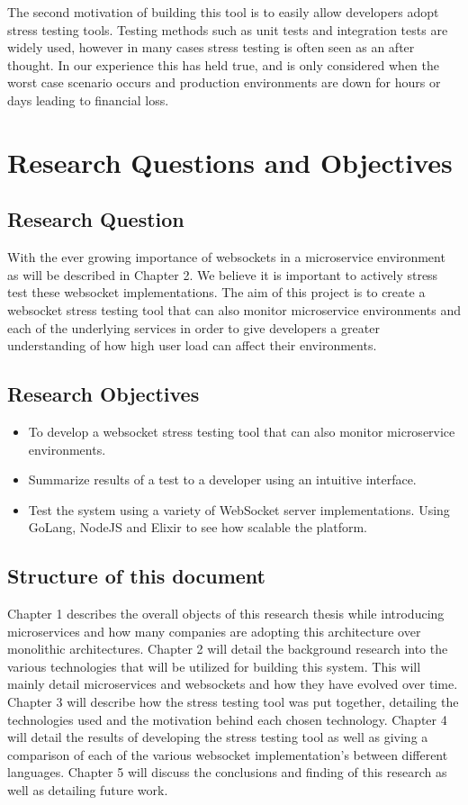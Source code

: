 The second motivation of building this tool is to easily allow developers adopt stress testing tools. Testing methods such as unit tests and integration tests are widely used, however in many cases stress testing is often seen as an after thought. In our experience this has held true, and is only considered when the worst case scenario occurs and production environments are down for hours or days leading to financial loss.

\section{Research Questions and Objectives}

\subsection{Research Question}

With the ever growing importance of websockets in a microservice environment as will be described in Chapter 2. We believe it is important to actively stress test these websocket implementations. The aim of this project is to create a websocket stress testing tool that can also monitor microservice environments and each of the underlying services in order to give developers a greater understanding of how high user load can affect their environments.

\subsection{Research Objectives}

\begin{itemize}
  \item To develop a websocket stress testing tool that can also monitor microservice environments.
  \item Summarize results of a test to a developer using an intuitive interface.
  \item Test the system using a variety of WebSocket server implementations. Using GoLang, NodeJS and Elixir to see how scalable the platform.
\end{itemize}

\subsection{Structure of this document}

Chapter 1 describes the overall objects of this research thesis while introducing microservices and how many companies are adopting this architecture over monolithic architectures. Chapter 2 will detail the background research into the various technologies that will be utilized for building this system. This will mainly detail microservices and websockets and how they have evolved over time. Chapter 3 will describe how the stress testing tool was put together, detailing the technologies used and the motivation behind each chosen technology. Chapter 4 will detail the results of developing the stress testing tool as well as giving a comparison of each of the various websocket implementation's between different languages. Chapter 5 will discuss the conclusions and finding of this research as well as detailing future work.